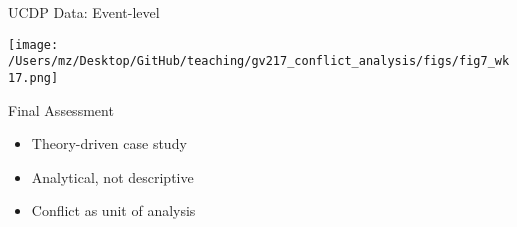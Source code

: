 \documentclass{beamer}
\begin{document}
\begin{frame}{UCDP Data: Event-level}
    \pause
    \begin{center}
        \texttt{[image: /Users/mz/Desktop/GitHub/teaching/gv217\_conflict\_analysis/figs/fig7\_wk17.png]}
    \end{center}
\end{frame}

\begin{frame}{Final Assessment}
    \begin{itemize}
        \pause\item Theory-driven case study
        \pause\item Analytical, not descriptive
        \pause\item Conflict as unit of analysis
    \end{itemize}
\end{frame}
\end{document}
